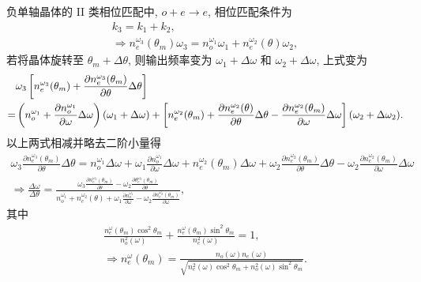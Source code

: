 \documentclass{assignment}
\begin{document}
\begin{sol}
    负单轴晶体的 II 类相位匹配中, $o+e\rightarrow e$, 相位匹配条件为
    \begin{gather}
        k_3=k_1+k_2,\\
        \Longrightarrow n_e^{\omega_3}(\theta_m)\omega_3=n_o^{\omega_1}\omega_1+n_e^{\omega_2}(\theta)\omega_2,
    \end{gather}
    若将晶体旋转至 $\theta_m+\Delta\theta$, 则输出频率变为 $\omega_1+\Delta\omega$ 和 $\omega_2+\Delta\omega$, 上式变为
    \begin{align}
        \notag&\omega_3\left[n_e^{\omega_3}(\theta_m)+\frac{\partial n_e^{\omega_3}(\theta_m)}{\partial\theta}\Delta\theta\right]\\
        =&\left(n_o^{\omega_1}+\frac{\partial n_o^{\omega_1}}{\partial\omega}\Delta\omega\right)(\omega_1+\Delta\omega)+\left[n_e^{\omega_2}(\theta_m)+\frac{\partial n_e^{\omega_2}(\theta)}{\partial\theta}\Delta\theta-\frac{\partial n_e^{\omega_2}(\theta_m)}{\partial\omega}\Delta\omega\right](\omega_2+\Delta\omega_2).
    \end{align}
    以上两式相减并略去二阶小量得
    \begin{gather}
        \omega_3\frac{\partial n_e^{\omega_3}(\theta_m)}{\partial\theta}\Delta\theta=n_o^{\omega_1}\Delta\omega+\omega_1\frac{\partial n_o^{\omega_1}}{\partial\omega}\Delta\omega+n_e^{\omega_2}(\theta_m)\Delta\omega+\omega_2\frac{\partial n_e^{\omega_2}(\theta_m)}{\partial\theta}\Delta\theta-\omega_2\frac{\partial n_e^{\omega_2}(\theta_m)}{\partial\omega}\Delta\omega\\
        \Longrightarrow\frac{\Delta\omega}{\Delta\theta}=\frac{\omega_3\frac{\partial n_e^{\omega_3}(\theta_m)}{\partial\theta}-\omega_2\frac{\partial\theta_e^{\omega_2}(\theta_m)}{\partial\theta}}{n_o^{\omega_1}+n_e^{\omega_2}(\theta)+\omega_1\frac{\partial n_o^{\omega_1}}{\partial\omega}-\omega_2\frac{\partial n_e^{\omega_2}(\theta_m)}{\partial\omega}},
    \end{gather}
    其中
    \begin{gather}
        \frac{n_e^{\omega}(\theta_m)\cos^2\theta_m}{n_o^2(\omega)}+\frac{n_e^{\omega}(\theta_m)\sin^2\theta_m}{n_e^2(\omega)}=1,\\
        \Longrightarrow n_e^{\omega}(\theta_m)=\frac{n_o(\omega)n_e(\omega)}{\sqrt{n_e^2(\omega)\cos^2\theta_m+n_o^2(\omega)\sin^2\theta_m}}.
    \end{gather}
\end{sol}
\end{document}

